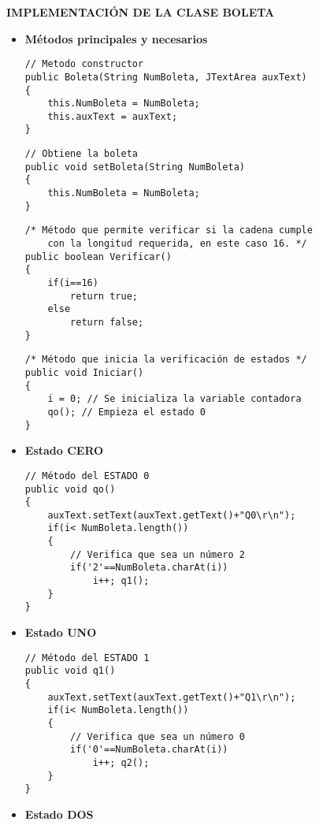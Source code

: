 \documentclass[12pt]{article}
\begin{document}
	\textbf{IMPLEMENTACIÓN DE LA CLASE BOLETA}
	\begin{itemize}
		\item[$\overrightarrow$] \textbf{Métodos principales y necesarios}

		\begin{lstlisting}[style=Java]
// Metodo constructor
public Boleta(String NumBoleta, JTextArea auxText)
{
	this.NumBoleta = NumBoleta;
	this.auxText = auxText;
}
		\end{lstlisting}

		\begin{lstlisting}[style=Java]
// Obtiene la boleta
public void setBoleta(String NumBoleta)
{
	this.NumBoleta = NumBoleta;
}
		\end{lstlisting}

\newpage
	
		\begin{lstlisting}[style=Java]
/* Método que permite verificar si la cadena cumple 
	con la longitud requerida, en este caso 16. */
public boolean Verificar()
{
	if(i==16)
		return true;
	else
		return false;
}
		\end{lstlisting}

		\begin{lstlisting}[style=Java]
/* Método que inicia la verificación de estados */
public void Iniciar()
{
	i = 0; // Se inicializa la variable contadora
	qo(); // Empieza el estado 0
}
		\end{lstlisting}
		

		\item[$\overrightarrow$] \textbf{Estado CERO}

		\begin{lstlisting}[style=Java]
// Método del ESTADO 0 
public void qo()
{
	auxText.setText(auxText.getText()+"Q0\r\n");
	if(i< NumBoleta.length())
	{
		// Verifica que sea un número 2
		if('2'==NumBoleta.charAt(i))
			i++; q1();
	}
}	
		\end{lstlisting}

		\item[$\overrightarrow$] \textbf{Estado UNO}

		\begin{lstlisting}[style=Java]
// Método del ESTADO 1
public void q1()
{
	auxText.setText(auxText.getText()+"Q1\r\n");
	if(i< NumBoleta.length())
	{
		// Verifica que sea un número 0
		if('0'==NumBoleta.charAt(i))
			i++; q2();
	}
}
		\end{lstlisting}
\newpage

		\item[$\overrightarrow$] \textbf{Estado DOS}


\end{itemize}
\end{document}

